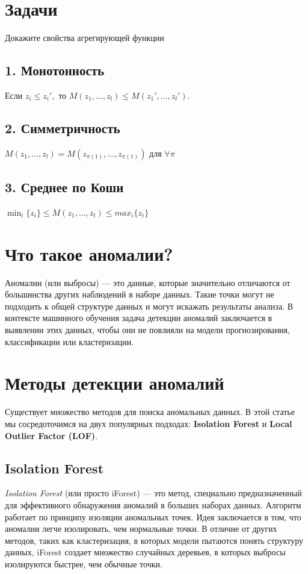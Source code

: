 \section*{Задачи}
Докажите свойства агрегирующей функции
\subsection*{1. Монотонность}
$\text{Если } z_i \leq z_i' , \text{ то } M(z_1, \dots, z_l) \leq M(z_1', \dots, z_l').$
\subsection*{2. Симметричность}
$M(z_1, \dots, z_l) = M(z_{\pi(1)}, \dots, z_{\pi(1)}) \text{ для } \forall \pi$
\subsection*{3. Среднее по Коши}
$\min_i{\{z_i\}} \leq M(z_1, \dots, z_t) \leq max_i{\{z_i\}}$

\section{Что такое аномалии?}
Аномалии (или выбросы) — это данные, которые значительно отличаются от большинства других наблюдений в наборе данных. Такие точки могут не подходить к общей структуре данных и могут искажать результаты анализа. В контексте машинного обучения задача детекции аномалий заключается в выявлении этих данных, чтобы они не повлияли на модели прогнозирования, классификации или кластеризации.

\section{Методы детекции аномалий}
Существует множество методов для поиска аномальных данных. В этой статье мы сосредоточимся на двух популярных подходах: \textbf{Isolation Forest} и \textbf{Local Outlier Factor (LOF)}.

\subsection{Isolation Forest}
\textit{Isolation Forest} (или просто iForest) — это метод, специально предназначенный для эффективного обнаружения аномалий в больших наборах данных. Алгоритм работает по принципу изоляции аномальных точек. Идея заключается в том, что аномалии легче изолировать, чем нормальные точки. В отличие от других методов, таких как кластеризация, в которых модели пытаются понять структуру данных, iForest создает множество случайных деревьев, в которых выбросы изолируются быстрее, чем обычные точки.


